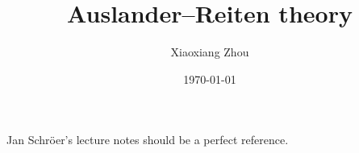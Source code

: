 \documentclass[pdf]{beamer}
\title{Auslander--Reiten theory}
\author{Xiaoxiang Zhou}
\institute[Bonn uni]{Universität Bonn}
\date{\today} %
\numberwithin{equation}{section}
\theoremstyle{plain}
\theoremstyle{plain}
\theoremstyle{remark}
\begin{document}
\begin{frame}
	\titlepage
	Jan Schröer's lecture notes should be a perfect reference. 
\end{frame}
\end{document}
